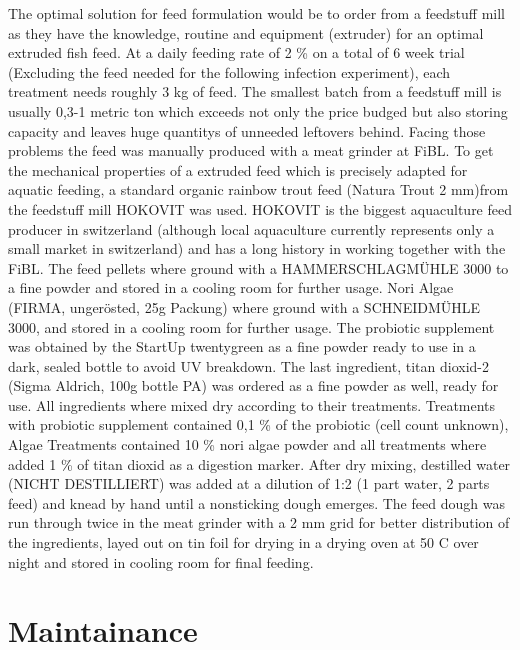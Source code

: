 The optimal solution for feed formulation would be to order from a feedstuff mill
as they have the knowledge, routine and equipment (extruder) for an optimal extruded
fish feed. At a daily feeding rate of 2 \% on a total of 6 week trial (Excluding the feed needed for the following
infection experiment), each treatment needs roughly 3 kg of feed. 
The smallest batch from a feedstuff mill is usually 0,3-1 metric
ton which exceeds not only the price budged but also storing capacity and leaves huge
quantitys of unneeded leftovers behind. 
Facing those problems the feed was manually produced with a meat grinder at FiBL.
To get the mechanical properties of a extruded feed which is precisely adapted for 
aquatic feeding, a standard organic rainbow trout feed (Natura Trout 2 mm)from the feedstuff mill HOKOVIT
was used. HOKOVIT is the biggest aquaculture feed producer in switzerland (although
local aquaculture currently represents only a small market in switzerland) and has
a long history in working together with the FiBL. 
The feed pellets where ground with a HAMMERSCHLAGMÜHLE 3000 to a fine powder
and stored in a cooling room for further usage. 
Nori Algae (FIRMA, ungerösted, 25g Packung) where ground with a SCHNEIDMÜHLE 3000, and stored
in a cooling room for further usage.
The probiotic supplement was obtained by the StartUp twentygreen as a fine powder ready
to use in a dark, sealed bottle to avoid UV breakdown.
The last ingredient, titan dioxid-2 (Sigma Aldrich, 100g bottle PA) was ordered as
a fine powder as well, ready for use.
All ingredients where mixed dry according to their treatments. Treatments with
probiotic supplement contained 0,1 \% of the probiotic (cell count unknown), Algae Treatments contained
10 \% nori algae powder and all treatments where added 1 \% of titan dioxid as a digestion
marker. After dry mixing, destilled water (NICHT DESTILLIERT) was added at a dilution of
1:2 (1 part water, 2 parts feed) and knead by hand until a nonsticking dough emerges.
The feed dough was run through twice in the meat grinder with a 2 mm grid for better distribution
of the ingredients, layed out on tin foil for drying in a drying oven at 50 C over night and
stored in cooling room for final feeding.

\section{Maintainance}

